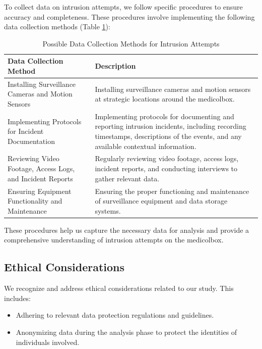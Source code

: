 \documentclass[../main.tex]{subfiles}
\begin{document}
    To collect data on \gls{intrusion} attempts, we follow specific procedures to
    ensure accuracy and completeness. These procedures involve implementing the
    following data collection methods (Table \ref{tab:DataCollectionMethods}):

    \begin{table}[htbp]
        \centering
        \caption{Possible Data Collection Methods for Intrusion Attempts}
        \label{tab:DataCollectionMethods}
        \begin{tabular}{|l|p{10cm}|} \hline
            \textbf{Data Collection Method} & \textbf{Description} \\ \hline
            Installing Surveillance Cameras and Motion Sensors &
            Installing surveillance cameras and motion sensors at strategic locations around the \gls{medicolbox}. \\ \hline
            
            Implementing Protocols for Incident Documentation &
            Implementing protocols for documenting and reporting \gls{intrusion} incidents, including recording timestamps, descriptions of the events, and any available contextual information. \\ \hline
            
            Reviewing Video Footage, Access Logs, and Incident Reports &
            Regularly reviewing video footage, access logs, incident reports, and conducting interviews to gather relevant data. \\ \hline
            
            Ensuring Equipment Functionality and Maintenance &
            Ensuring the proper functioning and maintenance of surveillance equipment and data storage systems. \\ \hline
        \end{tabular}
    \end{table}
    
    These procedures help us capture the necessary data for analysis and provide a
    comprehensive understanding of \gls{intrusion} attempts on the \gls{medicolbox}.

    \subsection{Ethical Considerations}

    We recognize and address ethical considerations related to our study. This includes:

    \begin{itemize}
        \item Adhering to relevant data protection regulations and guidelines.
        \item Anonymizing data during the analysis phase to protect the identities of individuals involved.
    \end{itemize}
\end{document}
